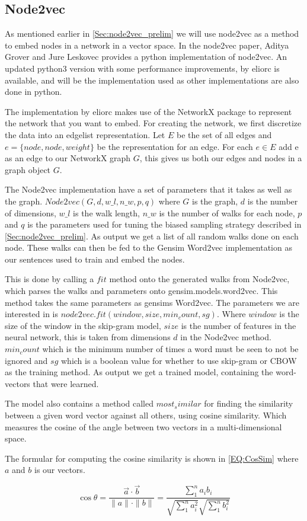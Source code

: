 \subsection{Node2vec}

As mentioned earlier in \ref{Sec:node2vec_prelim} we will use node2vec as a method to embed nodes in a network in a vector space. In the node2vec paper, Aditya Grover and Jure Leskovec provides a python implementation of node2vec. An updated python3 version with some performance improvements, by eliorc\cite{n2v.eliorc} is available, and will be the implementation used as other implementations are also done in python.

The implementation by eliorc makes use of the NetworkX package to represent the network that you want to embed. For creating the network, we first discretize the data into an edgelist representation. Let $E$ be the set of all edges and $e = \{node, node, weight\}$ be the representation for an edge. For each $e \in E$ add e as an edge to our NetworkX graph $G$, this gives us both our edges and nodes in a graph object $G$.

The Node2vec implementation have a set of parameters that it takes as well as the graph. $Node2vec(G, d, w\_l, n\_w, p, q)$ where $G$ is the graph, $d$ is the number of dimensions, $w\_l$ is the walk length, $n\_w$ is the number of walks for each node, $p$ and $q$ is the parameters used for tuning the biased sampling strategy described in \ref{Sec:node2vec_prelim}. As output we get a list of all random walks done on each node. These walks can then be fed to the Gensim Word2vec\cite{Gensim.Word2vec} implementation as our sentences used to train and embed the nodes.

This is done by calling a $fit$ method onto the generated walks from Node2vec, which parses the walks and parameters onto gensim.models.word2vec\cite{Gensim.Word2vec}. This method takes the same parameters as gensims Word2vec. The parameters we are interested in is $node2vec.fit(window, size, min_count, sg)$. Where $window$ is the size of the window in the skip-gram model, $size$ is the number of features in the neural network, this is taken from dimensions $d$ in the Node2vec method. $min_count$ which is the minimum number of times a word must be seen to not be ignored and $sg$ which is a boolean value for whether to use skip-gram or CBOW as the training method. As output we get a trained model, containing the word-vectors that were learned.

The model also contains a method called $most_similar$ for finding the similarity between a given word vector against all others, using cosine similarity. Which measures the cosine of the angle between two vectors in a multi-dimensional space.

The formular for computing the cosine similarity is shown in \autoref{EQ:CosSim} where $a$ and $b$ is our vectors.

\begin{equation}\label{EQ:CosSim}
\cos\theta = 
\frac{\vec{a}\cdot\vec{b}}{\parallel a\parallel
\cdot\parallel b\parallel} = 
\frac{\sum_1^n a_i b_i}{\sqrt{\sum_1^n a_i^2}\sqrt{\sum_1^n b_i^2}}
\end{equation}

